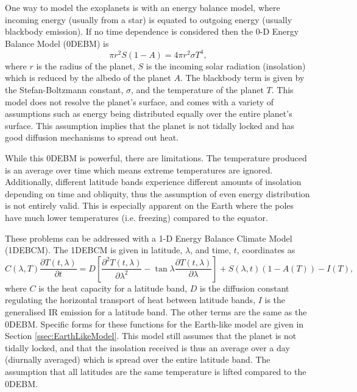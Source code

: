 \documentclass[12pt, onecolumn]{revtex4-2}    %
\newcommand{\partialderiv}[2]{\frac{\partial {#1}}{\partial {#2}}}
\newcommand{\partialderivsecnd}[2]{\frac{\partial^2 {#1}}{\partial {#2}^2}}
\begin{document}
One way to model the exoplanets is with an energy balance model, where incoming energy (usually from a star) is equated to outgoing energy (usually blackbody emission).
If no time dependence is considered then the 0-D Energy Balance Model (0DEBM) is 
\begin{equation}
  \pi r^2 S(1-A) = 4 \pi r^2 \sigma T^4,
  \label{eq:0DEBM}
\end{equation}
where $r$ is the radius of the planet, $S$ is the incoming solar radiation (insolation) which is reduced by the albedo of the planet $A$.
The blackbody term is given by the Stefan-Boltzmann constant, $\sigma$, and the temperature of the planet $T$.
This model does not resolve the planet's surface, and comes with a variety of assumptions such as energy being distributed equally over the entire planet's surface.
This assumption implies that the planet is not tidally locked and has good diffusion mechanisms to spread out heat.

While this 0DEBM is powerful, there are limitations.
The temperature produced is an average over time which means extreme temperatures are ignored.
Additionally, different latitude bands experience different amounts of insolation depending on time and obliquity, thus the assumption of even energy distribution is not entirely valid.
This is especially apparent on the Earth where the poles have much lower temperatures (i.e. freezing) compared to the equator.

%
These problems can be addressed with a 1-D Energy Balance Climate Model (1DEBCM).
The 1DEBCM is given in latitude, $\lambda$, and time, $t$, coordinates as
\begin{equation}
  C(\lambda, T) \partialderiv{T(t, \lambda)}{t} = D\left[\partialderivsecnd{T(t, \lambda)}{\lambda} - \tan\lambda\partialderiv{T(t, \lambda)}{\lambda}\right] + S(\lambda, t)(1-A(T)) - I(T),
  \label{eq:1DEBCM}
\end{equation}
where $C$ is the heat capacity for a latitude band, $D$ is the diffusion constant regulating the horizontal transport of heat between latitude bands, $I$ is the generalised IR emission for a latitude band. 
The other terms are the same as the 0DEBM.
Specific forms for these functions for the Earth-like model are given in Section \ref{ssec:EarthLikeModel}.
This model still assumes that the planet is not tidally locked, and that the insolation received is thus an average over a day (diurnally averaged) which is spread over the entire latitude band.
The assumption that all latitudes are the same temperature is lifted compared to the 0DEBM.
\end{document}
